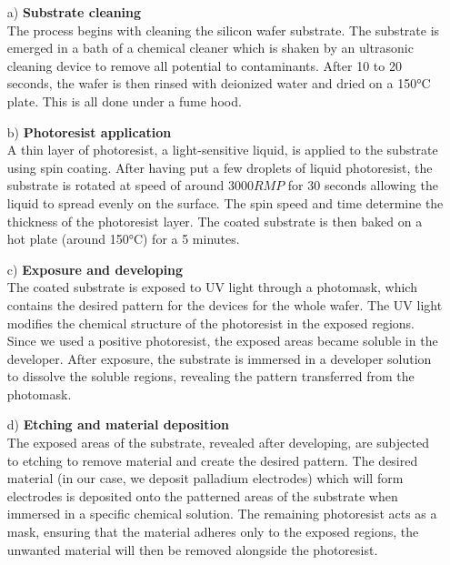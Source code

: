 \documentclass[a4paper,12pt,twoside]{article}
\begin{document}
\begin{enumerate}
    \item[a)] \textbf{Substrate cleaning} \\
    The process begins with cleaning the silicon wafer substrate. The substrate is emerged in a bath of a chemical cleaner which is shaken by an ultrasonic cleaning device to remove all potential to contaminants. After 10 to 20 seconds, the wafer is then rinsed with deionized water and dried on a 150°C plate. This is all done under a fume hood.

    \item[b)] \textbf{Photoresist application} \\
    A thin layer of photoresist, a light-sensitive liquid, is applied to the substrate using spin coating. After having put a few droplets of liquid photoresist, the substrate is rotated at speed of around $3000 RMP$ for $30$ seconds allowing the liquid to spread evenly on the surface. The spin speed and time determine the thickness of the photoresist layer. The coated substrate is then baked on a hot plate (around 150°C) for a 5 minutes.

    \item[c)] \textbf{Exposure and developing} \\
    The coated substrate is exposed to UV light through a photomask, which contains the desired pattern for the devices for the whole wafer. The UV light modifies the chemical structure of the photoresist in the exposed regions. Since we used a  positive photoresist, the exposed areas became soluble in the developer. After exposure, the substrate is immersed in a developer solution to dissolve the soluble regions, revealing the pattern transferred from the photomask.

    \item[d)] \textbf{Etching and material deposition} \\
    The exposed areas of the substrate, revealed after developing, are subjected to etching to remove material and create the desired pattern. The desired material (in our case, we deposit palladium electrodes) which will form electrodes is deposited onto the patterned areas of the substrate when immersed in a specific chemical solution. The remaining photoresist acts as a mask, ensuring that the material adheres only to the exposed regions, the unwanted material will then be removed alongside the photoresist.
    


\end{enumerate}
\end{document}
